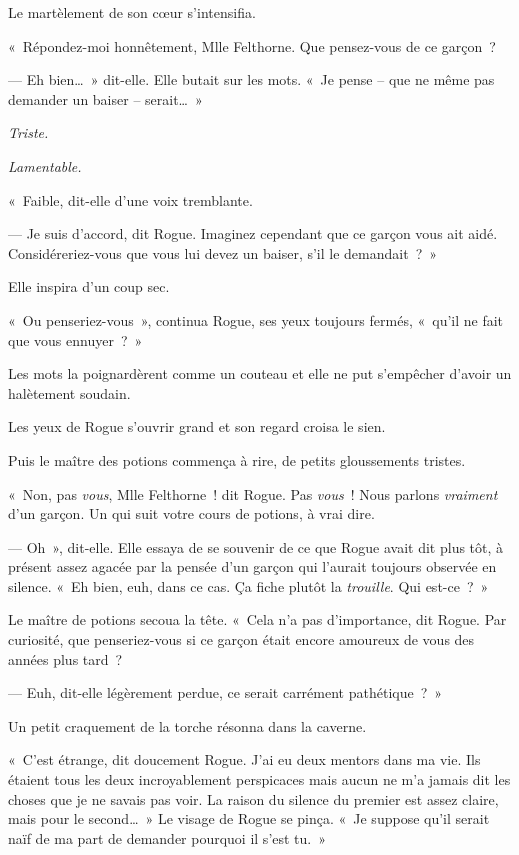 Le martèlement de son cœur s'intensifia.

«~Répondez-moi honnêtement, Mlle Felthorne. Que pensez-vous de ce garçon~?

--- Eh bien…~» dit-elle. Elle butait sur les mots. «~Je pense -- que ne même pas demander un baiser -- serait…~»

\emph{Triste.}

\emph{Lamentable.}

«~Faible, dit-elle d'une voix tremblante.

--- Je suis d'accord, dit Rogue. Imaginez cependant que ce garçon vous ait aidé. Considéreriez-vous que vous lui devez un baiser, s'il le demandait~?~»

Elle inspira d'un coup sec.

«~Ou penseriez-vous~», continua Rogue, ses yeux toujours fermés, «~qu'il ne fait que vous ennuyer~?~»

Les mots la poignardèrent comme un couteau et elle ne put s'empêcher d'avoir un halètement soudain.

Les yeux de Rogue s'ouvrir grand et son regard croisa le sien.

Puis le maître des potions commença à rire, de petits gloussements tristes.

«~Non, pas \emph{vous}, Mlle Felthorne~! dit Rogue. Pas \emph{vous}~! Nous parlons \emph{vraiment} d'un garçon. Un qui suit votre cours de potions, à vrai dire.

--- Oh~», dit-elle. Elle essaya de se souvenir de ce que Rogue avait dit plus tôt, à présent assez agacée par la pensée d'un garçon qui l'aurait toujours observée en silence. «~Eh bien, euh, dans ce cas. Ça fiche plutôt la \emph{trouille}. Qui est-ce~?~»

Le maître de potions secoua la tête. «~Cela n'a pas d'importance, dit Rogue. Par curiosité, que penseriez-vous si ce garçon était encore amoureux de vous des années plus tard~?

--- Euh, dit-elle légèrement perdue, ce serait carrément pathétique~?~»

Un petit craquement de la torche résonna dans la caverne.

«~C'est étrange, dit doucement Rogue. J'ai eu deux mentors dans ma vie. Ils étaient tous les deux incroyablement perspicaces mais aucun ne m'a jamais dit les choses que je ne savais pas voir. La raison du silence du premier est assez claire, mais pour le second…~» Le visage de Rogue se pinça. «~Je suppose qu'il serait naïf de ma part de demander pourquoi il s'est tu.~»

